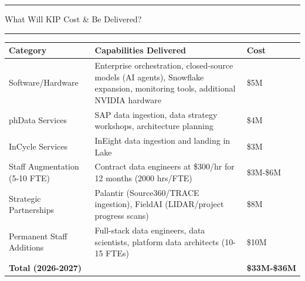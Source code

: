 \documentclass[12pt, a4paper]{article}
\begin{document}
     \begin{center}
         \noindent\rule{\linewidth}{2pt}
         
         \vspace{0.15em}
         
         {\large What Will KIP Cost \& Be Delivered?}
         
         \vspace{0.15em}
         
         \noindent\rule{\linewidth}{2pt}
     \end{center}

     \vspace{-0.9em}

     {\footnotesize
     }

     \vspace{0.1em}

     {\footnotesize
     \renewcommand{\arraystretch}{1.05}
     \begin{tabularx}{\textwidth}{@{}>{\raggedright\arraybackslash}X>{\raggedright\arraybackslash}X>{\raggedleft\arraybackslash}p{3cm}@{}}
     \toprule
     \textbf{Category} & \textbf{Capabilities Delivered} & \textbf{Cost} \\
     \midrule
     Software/Hardware & Enterprise orchestration, closed-source models (AI agents), Snowflake expansion, monitoring tools, additional NVIDIA hardware & \$5M \\
     \midrule
     phData Services & SAP data ingestion, data strategy workshops, architecture planning & \$4M \\
     \midrule
     InCycle Services & InEight data ingestion and landing in Lake & \$3M \\
     \midrule
     Staff Augmentation (5-10 FTE) & Contract data engineers at \$300/hr for 12 months (2000 hrs/FTE) & \$3M-\$6M \\
     \midrule
     Strategic Partnerships & Palantir (Source360/TRACE ingestion), FieldAI (LIDAR/project progress scans) & \$8M \\
     \midrule
     Permanent Staff Additions & Full-stack data engineers, data scientists, platform data architects (10-15 FTEs) & \$10M \\
     \midrule
     \textbf{Total (2026-2027)} & & \textbf{\$33M-\$36M} \\
     \bottomrule
     \end{tabularx}
     \renewcommand{\arraystretch}{1.0}
     }
\end{document}
